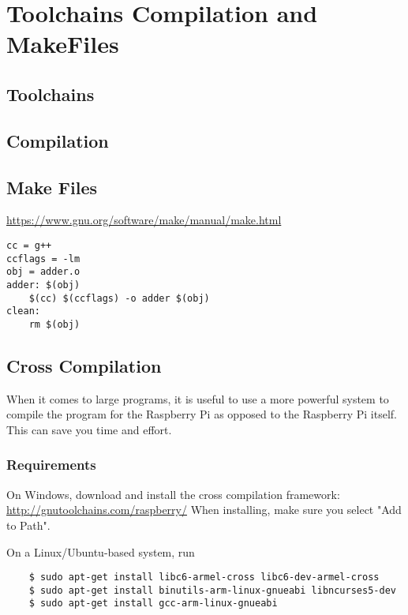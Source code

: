 \section{Toolchains Compilation and MakeFiles}

\subsection{Toolchains}

\subsection{Compilation}

\subsection{Make Files}
\href{https://www.gnu.org/software/make/manual/make.html}{https://www.gnu.org/software/make/manual/make.html}

\begin{verbatim}
cc = g++
ccflags = -lm
obj = adder.o
adder: $(obj)
    $(cc) $(ccflags) -o adder $(obj)
clean: 
    rm $(obj)
\end{verbatim}

\subsection{Cross Compilation}
When it comes to large programs, it is useful to use a more powerful system to compile the program for the Raspberry Pi as opposed to the Raspberry Pi itself. This can save you time and effort.

\subsubsection{Requirements}
On Windows, download and install the cross compilation framework: \newline
\href{http://gnutoolchains.com/raspberry/}{ http://gnutoolchains.com/raspberry/} \newline
When installing, make sure you select "Add to Path".

On a Linux/Ubuntu-based system, run
\begin{verbatim}
    $ sudo apt-get install libc6-armel-cross libc6-dev-armel-cross 
    $ sudo apt-get install binutils-arm-linux-gnueabi libncurses5-dev
    $ sudo apt-get install gcc-arm-linux-gnueabi
\end{verbatim}

